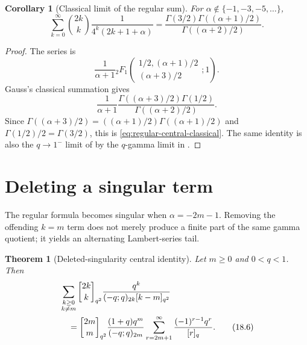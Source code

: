 \documentclass[11pt,oneside,openany]{book}
\newtheorem{theorem}{Theorem}[chapter]
\newtheorem{corollary}[corollary]{Corollary}
\theoremstyle{definition}
\theoremstyle{remark}
\newcommand{\Qbinom}[3]{\genfrac{[}{]}{0pt}{}{#1}{#2}_{#3}}
\begin{document}
\begin{corollary}[Classical limit of the regular sum]\label{cor:regular-central-classical}
For $\alpha\notin\{-1,-3,-5,\ldots\}$,
\[
 \sum_{k=0}^{\infty}\binom{2k}{k}
 \frac1{4^k(2k+1+\alpha)}
 =\frac{\Gamma(3/2)\Gamma((\alpha+1)/2)}
        {\Gamma((\alpha+2)/2)}.
 \tag{18.5}\label{eq:regular-central-classical}
\]
\end{corollary}

\begin{proof}
The series is
\[
 \frac1{\alpha+1}
 {}_2F_1\!\left(
 \begin{matrix}1/2,(\alpha+1)/2\\(\alpha+3)/2\end{matrix};1\right).
\]
Gauss's classical summation gives
\[
 \frac1{\alpha+1}
 \frac{\Gamma((\alpha+3)/2)\Gamma(1/2)}
      {\Gamma((\alpha+2)/2)}.
\]
Since $\Gamma((\alpha+3)/2)=((\alpha+1)/2)\Gamma((\alpha+1)/2)$ and $\Gamma(1/2)/2=\Gamma(3/2)$, this is \eqref{eq:regular-central-classical}.  The same identity is also the $q\to1^-$ limit of  by the $q$-gamma limit in .
\end{proof}

\section{Deleting a singular term}

The regular formula becomes singular when $\alpha=-2m-1$.  Removing the offending $k=m$ term does not merely produce a finite part of the same gamma quotient; it yields an alternating Lambert-series tail.

\begin{theorem}[Deleted-singularity central identity]\label{thm:singular-central}
Let $m\ge0$ and $0<q<1$.  Then
\begin{align}
 &\sum_{\substack{k\ge0\\k\ne m}}
 \Qbinom{2k}{k}{q^2}
 \frac{q^k}{(-q;q)_{2k}[k-m]_{q^2}}
 \notag\\
 &\quad=
 \Qbinom{2m}{m}{q^2}
 \frac{(1+q)q^m}{(-q;q)_{2m}}
 \sum_{r=2m+1}^{\infty}
 \frac{(-1)^{r-1}q^r}{[r]_q}.
 \tag{18.6}\label{eq:singular-central}
\end{align}
\end{theorem}
\end{document}
